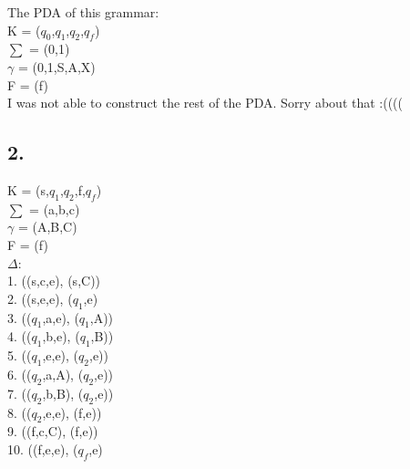 \documentclass[12pt]{article}
\begin{document}
The PDA of this grammar:\\
K  = ($q_0$,$q_1$,$q_2$,$q_f$)\\
$\sum$ = (0,1)\\
$\gamma$ = (0,1,S,A,X)\\
F = (f)\\


I was not able to construct the rest of the PDA. Sorry about that :((((




\subsection*{2.}    

K = (s,$q_1$,$q_2$,f,$q_f$)\\
$\sum$ = (a,b,c)\\
$\gamma$ = (A,B,C)\\
F = (f)\\
$\Delta$:\\
1. ((s,c,e), (s,C))\\
2. ((s,e,e), ($q_1$,e)\\
3. (($q_1$,a,e), ($q_1$,A))\\
4. (($q_1$,b,e), ($q_1$,B))\\
5. (($q_1$,e,e), ($q_2$,e))\\
6. (($q_2$,a,A), ($q_2$,e))\\
7. (($q_2$,b,B), ($q_2$,e))\\
8. (($q_2$,e,e), (f,e))\\
9. ((f,c,C), (f,e))\\
10. ((f,e,e), ($q_f$,e)\\
\end{document}
